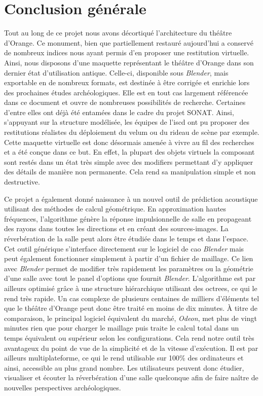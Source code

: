 \chapter*{Conclusion générale}
	
	
Tout au long de ce projet nous avons décortiqué l'architecture du théâtre d'Orange. Ce monument, bien que partiellement restauré aujourd'hui a conservé de nombreux indices nous ayant permis d'en proposer une restitution virtuelle. Ainsi, nous disposons d'une maquette représentant le théâtre d'Orange dans son dernier état d'utilisation antique. Celle-ci, disponible sous \textit{Blender}, mais exportable en de nombreux formats, est destinée à être corrigée et enrichie lors des prochaines études archéologiques. Elle est en tout cas largement référencée dans ce document et ouvre de nombreuses possibilités de recherche. Certaines d'entre elles ont déjà été entamées dans le cadre du projet SONAT. Ainsi, s'appuyant sur la structure modélisée, les équipes de l'\gls{iscd} ont pu proposer des restitutions réalistes du déploiement du \gls{velum} ou du rideau de scène par exemple. Cette maquette virtuelle est donc désormais amenée à vivre au fil des recherches et a été conçue dans ce but. En effet, la plupart des objets virtuels la composant sont restés dans un état très simple avec des \glspl{modifier} permettant d'y appliquer des détails de manière non permanente. Cela rend sa manipulation simple et non destructive.

Ce projet a également donné naissance à un nouvel outil de prédiction acoustique utilisant des méthodes de calcul géométrique. En approximation hautes fréquences, l'algorithme génère la réponse impulsionnelle de salle en propageant des rayons dans toutes les directions et en créant des sources-images. La réverbération de la salle peut alors être étudiée dans le temps et dans l'espace. Cet outil générique s'interface directement sur le logiciel de \gls{cao} \textit{Blender} mais peut également fonctionner simplement à partir d'un fichier de maillage. Ce lien avec \textit{Blender} permet de modifier très rapidement les paramètres ou la géométrie d'une salle avec tout le panel d'options que fournit \textit{Blender}. L'algorithme est par ailleurs optimisé grâce à une structure hiérarchique utilisant des \glspl{octree}, ce qui le rend très rapide. Un cas complexe de plusieurs centaines de milliers d'éléments tel que le théâtre d'Orange peut donc être traité en moins de dix minutes. À titre de comparaison, le principal logiciel équivalent du marché, \textit{Odeon}, met plus de vingt minutes rien que pour charger le maillage puis traite le calcul total dans un temps équivalent ou supérieur selon les configurations. Cela rend notre outil très avantageux du point de vue de la simplicité et de la vitesse d'exécution. Il est par ailleurs multiplateforme, ce qui le rend utilisable sur 100\% des ordinateurs et ainsi, accessible au plus grand nombre. Les utilisateurs peuvent donc étudier, visualiser et écouter la réverbération d'une salle quelconque afin de faire naître de nouvelles perspectives archéologiques.

